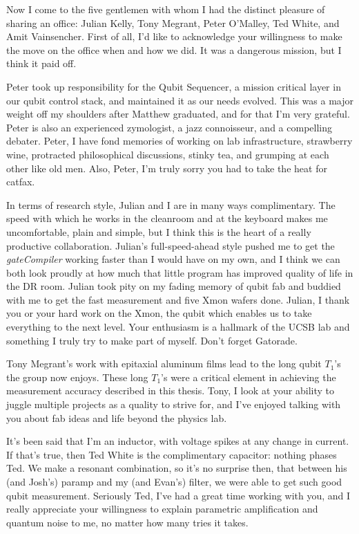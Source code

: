 \begin{acknowledgements}
Now I come to the five gentlemen with whom I had the distinct pleasure of sharing an office: Julian Kelly, Tony Megrant, Peter O'Malley, Ted White, and Amit Vainsencher.
First of all, I'd like to acknowledge your willingness to make the move on the office when and how we did.
It was a dangerous mission, but I think it paid off.

Peter took up responsibility for the Qubit Sequencer, a mission critical layer in our qubit control stack, and maintained it as our needs evolved.
This was a major weight off my shoulders after Matthew graduated, and for that I'm very grateful.
Peter is also an experienced zymologist, a jazz connoisseur, and a compelling debater.
Peter, I have fond memories of working on lab infrastructure, strawberry wine, protracted philosophical discussions, stinky tea, and grumping at each other like old men.
Also, Peter, I'm truly sorry you had to take the heat for catfax.

In terms of research style, Julian and I are in many ways complimentary.
The speed with which he works in the cleanroom and at the keyboard makes me uncomfortable, plain and simple, but I think this is the heart of a really productive collaboration.
Julian's full-speed-ahead style pushed me to get the \emph{gateCompiler} working faster than I would have on my own, and I think we can both look proudly at how much that little program has improved quality of life in the DR room.
Julian took pity on my fading memory of qubit fab and buddied with me to get the fast measurement and five Xmon wafers done.
Julian, I thank you or your hard work on the Xmon, the qubit which enables us to take everything to the next level.
Your enthusiasm is a hallmark of the UCSB lab and something I truly try to make part of myself.
Don't forget Gatorade.

Tony Megrant's work with epitaxial aluminum films lead to the long qubit $T_1$'s the group now enjoys.
These long $T_1$'s were a critical element in achieving the measurement accuracy described in this thesis.
Tony, I look at your ability to juggle multiple projects as a quality to strive for, and I've enjoyed talking with you about fab ideas and life beyond the physics lab.

It's been said that I'm an inductor, with voltage spikes at any change in current.
If that's true, then Ted White is the complimentary capacitor: nothing phases Ted.
We make a resonant combination, so it's no surprise then, that between his (and Josh's) paramp and my (and Evan's) filter, we were able to get such good qubit measurement.
Seriously Ted, I've had a great time working with you, and I really appreciate your willingness to explain parametric amplification and quantum noise to me, no matter how many tries it takes.


\end{acknowledgements}
